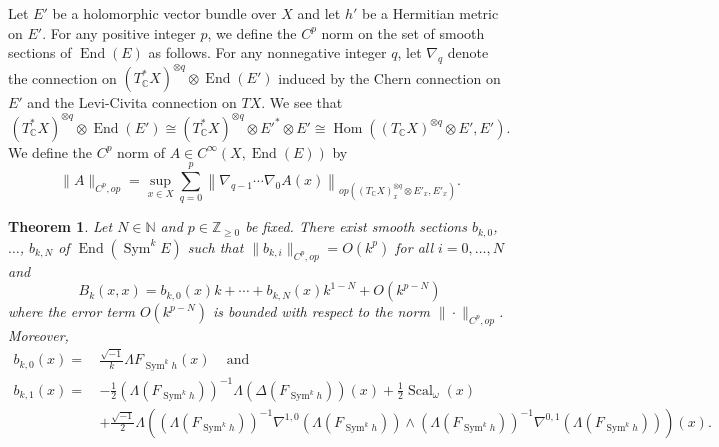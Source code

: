 \documentclass{amsart}
\newtheorem{thm}{Theorem}[section]
\theoremstyle{definition}
\theoremstyle{remark}
\numberwithin{equation}{section}
\DeclareMathOperator{\Hom}{Hom}
\DeclareMathOperator{\Sym}{Sym}
\DeclareMathOperator{\End}{End}
\DeclareMathOperator{\Scal}{Scal}
\begin{document}
Let $E'$ be a holomorphic vector bundle over $X$ and let $h'$ be a Hermitian metric on $E'$. For any positive integer $p$, we define the $C^p$ norm on the set of smooth sections of $\End(E)$ as follows. For any nonnegative integer $q$, let $\nabla_q$ denote the connection on $(T_\mathbb{C}^* X )^{\otimes q} \otimes \End(E')$ induced by the Chern connection on $E'$ and the Levi-Civita connection on $TX$. We see that
\begin{equation*}
(T_\mathbb{C}^* X )^{\otimes q} \otimes \End(E') \cong (T_\mathbb{C}^* X )^{\otimes q} \otimes E'^* \otimes E' \cong  \Hom \left ( (T_\mathbb{C} X)^{\otimes q} \otimes E', E' \right ).
\end{equation*}
We define the $C^p$ norm of $A \in C^\infty(X, \End(E))$ by
$$
\|A\|_{C^p,op} = \sup_{x \in X} \sum_{q=0}^p \left \| \nabla_{q-1} \dotsb \nabla_0 A (x) \right \|_{op \left ( (T_\mathbb{C} X)_{x}^{\otimes q} \otimes E'_x, E'_x \right )}.
$$







\begin{thm} \label{thm: Main 2}
Let $N \in \mathbb{N}$ and $p \in \mathbb{Z}_{\geq 0}$ be fixed. There exist smooth sections $b_{k,0}$, $\dotsc$, $b_{k,N}$ of $\End(\Sym^k E)$ such that $\|b_{k,i}\|_{C^p,op} = O(k^p)$ for all $i = 0, \dotsc, N$ and
$$
B_k(x,x) = b_{k,0}(x) k + \dotsb + b_{k,N}(x) k^{1-N} + O(k^{p-N})
$$
where the error term $O(k^{p-N})$ is bounded with respect to the norm $\| \cdot \|_{C^p,op}$. Moreover,
\begin{align*}
b_{k,0}(x) = \hspace{2pt} & \frac{\sqrt{-1}}{k} \Lambda F_{\Sym^k h}(x) \hspace{10pt} \text{ and } \\
    b_{k,1}(x) = \hspace{2pt} & -\frac{1}{2}(\Lambda (F_{\Sym^k h}) )^{-1}\Lambda (\Delta (F_{\Sym^k h})) (x) 
+ \frac{1}{2}\Scal_\omega(x)  \\
    & +  \frac{\sqrt{-1}}{2} \Lambda  \left ( (\Lambda(F_{\Sym^k h}))^{-1} \nabla^{1,0}(\Lambda(F_{\Sym^k h})) \wedge (\Lambda(F_{\Sym^k h}))^{-1} \nabla^{0,1}(\Lambda (F_{\Sym^k h}))   \right ) (x).
\end{align*}
\end{thm}
\end{document}
